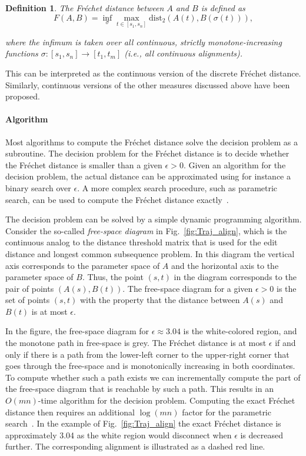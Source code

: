 \documentclass[10pt,letterpaper]{article}
\newcommand{\dist}{\ensuremath{\text{dist}}}
\newtheorem{definition}{Definition}
\begin{document}
\begin{definition}
The Fr\'echet distance between $A$ and $B$ is defined as
\[
F(A,B) = \inf_{\sigma} \max_{t \in [s_1,s_n]} \dist_2(A(t),B(\sigma (t))),
\]

where the infimum is taken over all continuous, strictly monotone-increasing functions $\sigma \colon [s_1,s_n] \rightarrow [t_1, t_m]$ (i.e., all continuous alignments).
\end{definition}

This can be interpreted as the continuous version of the discrete Fr\'echet distance. Similarly, continuous versions of the other measures discussed above have been proposed.

\paragraph{Algorithm} Most algorithms to compute the Fr\'echet distance solve the decision problem as a subroutine. The decision problem for the Fr\'echet distance is to decide whether the Fr\'echet distance is smaller than a given $\epsilon > 0$. Given an algorithm for the decision problem, the actual distance can be approximated using for instance a binary search over $\epsilon$. A more complex search procedure, such as parametric search, can be used to compute the Fr\'echet distance exactly~\cite{ag-cfd-95}.

The decision problem can be solved by a simple dynamic programming algorithm. Consider the so-called \emph{free-space diagram} in Fig.~\ref{fig:Traj_align}, which is the continuous analog to the distance threshold matrix that is used for the edit distance and longest common subsequence problem. In this diagram the vertical axis corresponds to the parameter space of $A$ and the horizontal axis to the parameter space of $B$. Thus, the point $(s,t)$ in the diagram corresponds to the pair of points $(A(s), B(t))$. The free-space diagram for a given $\epsilon > 0$ is the set of points $(s,t)$ with the property that the distance between $A(s)$ and $B(t)$ is at most $\epsilon$.

In the figure, the free-space diagram for $\epsilon \approx 3.04$ is the white-colored region, and the monotone path in free-space is grey. The Fr\'echet distance is at most $\epsilon$ if and only if there is a path from the lower-left corner to the upper-right corner that goes through the free-space and is monotonically increasing in both coordinates. To compute whether such a path exists we can incrementally compute the part of the free-space diagram that is reachable by such a path. This results in an $O(mn)$-time algorithm for the decision problem. Computing the exact Fr\'echet distance then requires an additional $\log (mn)$ factor for the parametric search~\cite{ag-cfd-95}. In the example of Fig.~\ref{fig:Traj_align} the exact Fr\'echet distance is approximately 3.04 as the white region would disconnect when $\epsilon$ is decreased further. The corresponding alignment is illustrated as a dashed red line.
\end{document}
